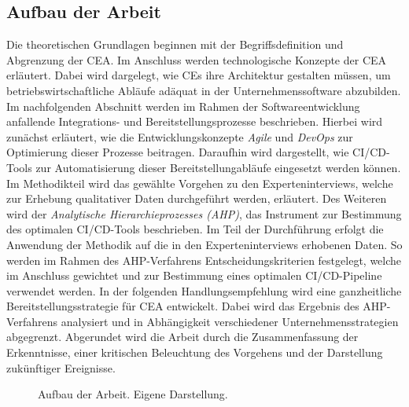 \subsection{Aufbau der Arbeit}
Die theoretischen Grundlagen beginnen mit der Begriffsdefinition und Abgrenzung der CEA. Im Anschluss werden technologische Konzepte der CEA erläutert. Dabei wird dargelegt, wie CEs ihre Architektur gestalten müssen, um betriebswirtschaftliche Abläufe adäquat in der Unternehmenssoftware abzubilden. Im nachfolgenden Abschnitt werden im Rahmen der Softwareentwicklung anfallende Integrations- und Bereitstellungsprozesse beschrieben. Hierbei wird zunächst erläutert, wie die Entwicklungskonzepte \textit{Agile} und \textit{DevOps} zur Optimierung dieser Prozesse beitragen. Daraufhin wird dargestellt, wie CI/CD-Tools zur Automatisierung dieser Bereitstellungabläufe eingesetzt werden können. Im Methodikteil wird das gewählte Vorgehen zu den Experteninterviews, welche zur Erhebung qualitativer Daten durchgeführt werden, erläutert. Des Weiteren wird der \textit{Analytische Hierarchieprozesses (\acs{AHP})}, das Instrument zur Bestimmung des optimalen CI/CD-Tools beschrieben. Im Teil der Durchführung erfolgt die Anwendung der Methodik auf die in den Experteninterviews erhobenen Daten. So werden im Rahmen des AHP-Verfahrens Entscheidungskriterien festgelegt, welche im Anschluss gewichtet und zur Bestimmung eines optimalen CI/CD-Pipeline verwendet werden. In der folgenden Handlungsempfehlung wird eine ganzheitliche Bereitstellungsstrategie für CEA entwickelt. Dabei wird das Ergebnis des AHP-Verfahrens analysiert und in Abhängigkeit verschiedener Unternehmensstrategien abgegrenzt. Abgerundet wird die Arbeit durch die Zusammenfassung der Erkenntnisse, einer kritischen Beleuchtung des Vorgehens und der Darstellung zukünftiger Ereignisse. 

\begin{center}
	\begin{figure}[H]
		\centering
		\caption[Aufbau der Arbeit]{Aufbau der Arbeit. Eigene Darstellung.}
		\label{fig:Aufbau}
	\end{figure}	
\end{center}
\vspace*{-15mm}
